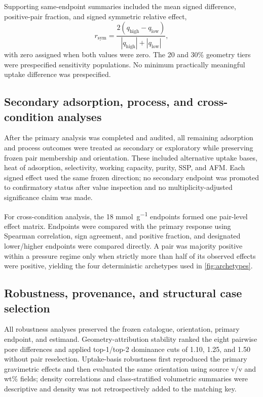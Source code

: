 \documentclass[11pt,a4paper]{article}
\begin{document}
Supporting same-endpoint summaries included the mean signed difference,
positive-pair fraction, and signed symmetric relative effect,
\[
r_{\mathrm{sym}}=
\frac{2(q_{\mathrm{high}}-q_{\mathrm{low}})}
{|q_{\mathrm{high}}|+|q_{\mathrm{low}}|},
\]
with zero assigned when both values were zero. The 20 and 30\% geometry tiers were
prespecified sensitivity populations. No minimum practically meaningful uptake
difference was prespecified.

\subsection{Secondary adsorption, process, and cross-condition analyses}

After the primary analysis was completed and audited, all remaining adsorption and
process outcomes were treated as secondary or exploratory while preserving frozen
pair membership and orientation. These included alternative uptake bases, heat of
adsorption, selectivity, working capacity, purity, SSP, and AFM. Each signed effect
used the same frozen direction; no secondary endpoint was promoted to confirmatory
status after value inspection and no multiplicity-adjusted significance claim was
made.

For cross-condition analysis, the 18 \si{\milli\mole\per\gram} endpoints formed one
pair-level effect matrix. Endpoints were compared with the primary response using
Spearman correlation, sign agreement, and positive fraction, and designated
lower/higher endpoints were compared directly. A pair was majority positive within
a pressure regime only when strictly more than half of its observed effects were
positive, yielding the four deterministic archetypes used in
\cref{fig:archetypes}.

\subsection{Robustness, provenance, and structural case selection}

All robustness analyses preserved the frozen catalogue, orientation, primary
endpoint, and estimand. Geometry-attribution stability ranked the eight pairwise
pore differences and applied top-1/top-2 dominance cuts of 1.10, 1.25, and 1.50
without pair reselection. Uptake-basis robustness first reproduced the primary
gravimetric effects and then evaluated the same orientation using source v/v and
wt\% fields; density correlations and class-stratified volumetric summaries were
descriptive and density was not retrospectively added to the matching key.
\end{document}
